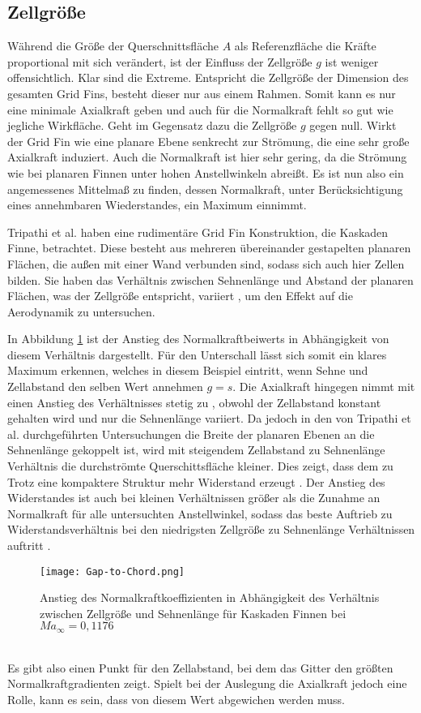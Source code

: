 \subsection{Zellgröße}
Während die Größe der Querschnittsfläche $A$ als Referenzfläche die Kräfte proportional mit sich verändert, ist der Einfluss der Zellgröße $g$ ist weniger offensichtlich. Klar sind die Extreme. Entspricht die Zellgröße der Dimension des gesamten Grid Fins, besteht dieser nur aus einem Rahmen. Somit kann es nur eine minimale Axialkraft geben und auch für die Normalkraft fehlt so gut wie jegliche Wirkfläche. Geht im Gegensatz dazu die Zellgröße $g$ gegen null. Wirkt der Grid Fin wie eine planare Ebene senkrecht zur Strömung, die eine sehr große Axialkraft induziert. Auch die Normalkraft ist hier sehr gering, da die Strömung wie bei planaren Finnen unter hohen Anstellwinkeln abreißt. Es ist nun also ein angemessenes Mittelmaß zu finden, dessen Normalkraft, unter Berücksichtigung eines annehmbaren Wiederstandes, ein Maximum einnimmt.

Tripathi et al. haben eine rudimentäre Grid Fin Konstruktion, die Kaskaden Finne, betrachtet. Diese besteht aus mehreren übereinander gestapelten planaren Flächen, die außen mit einer Wand verbunden sind, sodass sich auch hier Zellen bilden. Sie haben das Verhältnis zwischen Sehnenlänge und Abstand der planaren Flächen, was der Zellgröße entspricht, variiert \cite{ChordVar}, um den Effekt auf die Aerodynamik zu untersuchen.

In Abbildung \ref{abb_Gap-Chord} ist der Anstieg des Normalkraftbeiwerts in Abhängigkeit von diesem Verhältnis dargestellt. Für den Unterschall lässt sich somit ein klares Maximum erkennen, welches in diesem Beispiel eintritt, wenn Sehne und Zellabstand den selben Wert annehmen $g=s$.
Die Axialkraft hingegen nimmt mit einen Anstieg des Verhältnisses stetig zu \cite{ChordVar}, obwohl der Zellabstand konstant gehalten wird und nur die Sehnenlänge variiert. Da jedoch in den von Tripathi et al. durchgeführten Untersuchungen die Breite der planaren Ebenen an die Sehnenlänge gekoppelt ist, wird mit steigendem Zellabstand zu Sehnenlänge Verhältnis die durchströmte Querschittsfläche kleiner. Dies zeigt, dass dem zu Trotz eine kompaktere Struktur mehr Widerstand erzeugt \cite{ChordVar}. Der Anstieg des Widerstandes ist auch bei kleinen Verhältnissen größer als die Zunahme an Normalkraft für alle untersuchten Anstellwinkel, sodass das beste Auftrieb zu Widerstandsverhältnis bei den niedrigsten Zellgröße zu Sehnenlänge Verhältnissen auftritt \cite{ChordVar}.
\begin{figure}[h]
	\centering
	\texttt{[image: Gap-to-Chord.png]}
	\caption{Anstieg des Normalkraftkoeffizienten in Abhängigkeit des Verhältnis zwischen Zellgröße und Sehnenlänge für Kaskaden Finnen bei $Ma_\infty = 0,1176$}
	\label{abb_Gap-Chord}
\end{figure}\\
Es gibt also einen Punkt für den Zellabstand, bei dem das Gitter den größten Normalkraftgradienten zeigt. Spielt bei der Auslegung die Axialkraft jedoch eine Rolle, kann es sein, dass von diesem Wert abgewichen werden muss.
\newpage
